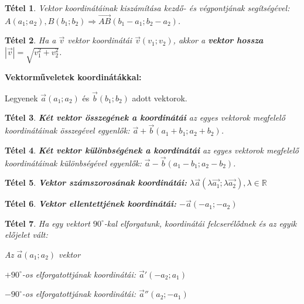 \documentclass[12pt,a4paper]{article}
\newtheorem{theorem}{Tétel} [section]
\begin{document}
\begin{theorem}
Vektor koordinátáinak kiszámítása kezdő- és végpontjának segítségével: $A(a_1;a_2), B(b_1;b_2)\Rightarrow\overrightarrow{AB}(b_1-a_1;b_2-a_2)$.
\end{theorem}

\begin{theorem}
Ha a $\vec{v}$ vektor koordinátái $\vec{v}(v_1;v_2)$, akkor a \textbf{vektor hossza} $|\vec{v}|=\sqrt{v_1^2+v_2^2}$.
\end{theorem}

\textbf{Vektorműveletek koordinátákkal:}

Legyenek $\vec{a}(a_1;a_2)$ és $\vec{b}(b_1;b_2)$ adott vektorok.

\begin{theorem}
\textbf{Két vektor összegének a koordinátái} az egyes vektorok megfelelő koordinátáinak összegével egyenlők: $\vec{a}+\vec{b}(a_1+b_1; a_2+b_2)$.
\end{theorem}

\begin{theorem}
\textbf{Két vektor különbségének a koordinátái} az egyes vektorok megfelelő koordinátáinak különbségével egyenlők: $\vec{a}-\vec{b}(a_1-b_1; a_2-b_2)$.
\end{theorem}

\begin{theorem}
\textbf{Vektor számszorosának koordinátái:} $\lambda\vec{a}(\lambda\vec{a_1};\lambda\vec{a_2}), \lambda\in \mathbb{R}$
\end{theorem}

\begin{theorem}
\textbf{Vektor ellentettjének koordinátái:} $-\vec{a}(-a_1; -a_2)$
\end{theorem}

\begin{theorem}
Ha egy vektort $90^\circ$-kal elforgatunk, koordinátái felcserélődnek és az egyik előjelet vált:

Az $\vec{a}(a_1;a_2)$ vektor

$+90^\circ$-os elforgatottjának koordinátái: $\vec{a}'(-a_2;a_1)$

$-90^\circ$-os elforgatottjának koordinátái: $\vec{a}''(a_2;-a_1)$
\end{theorem}
\end{document}

